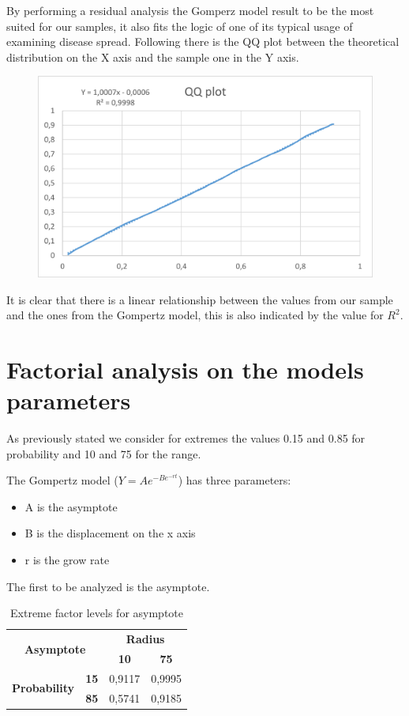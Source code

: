 By performing a residual analysis the Gomperz model result to be the most suited for our samples, it also fits the logic of one of its typical usage of examining disease spread. Following there is the QQ plot between the theoretical distribution on the X axis and the sample one in the Y axis.

\begin{figure}[H]
\centering
    \includegraphics[width= 1\textwidth]{./images/QQPlot200.png}
\end{figure}

It is clear that there is a linear relationship between the values from our sample and the ones from the Gompertz model, this is also indicated by the value for $R^2$.

\section{Factorial analysis on the models parameters}
As previously stated we consider for extremes the values 0.15 and 0.85 for probability and 10 and 75 for the range.

The Gompertz model ($ Y = Ae^{-Be^{-rt}} $) has three parameters:
\begin{itemize}
	\item A is the asymptote
	\item B is the displacement on the x axis
	\item r is the grow rate
\end{itemize}
The first to be analyzed is the asymptote.

\begin{table}[H]
\centering
\begin{tabular}{|cc|cc|}
\hline
\multicolumn{2}{|c|}{\multirow{2}{*}{\textbf{Asymptote}}} & \multicolumn{2}{c|}{\textbf{Radius}} \\ \cline{3-4} 
\multicolumn{2}{|c|}{} & \multicolumn{1}{c|}{\textbf{10}} & \textbf{75} \\ \hline
\multicolumn{1}{|c|}{\multirow{2}{*}{\textbf{Probability}}} & \textbf{15} & \multicolumn{1}{c|}{0,9117} & 0,9995 \\ \cline{2-4} 
\multicolumn{1}{|c|}{} & \textbf{85} & \multicolumn{1}{c|}{0,5741} & 0,9185 \\ \hline
\end{tabular}
\caption{Extreme factor levels for asymptote}
\end{table}

